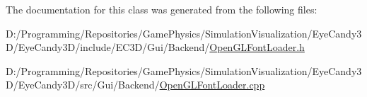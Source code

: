 The documentation for this class was generated from the following files\+:\begin{DoxyCompactItemize}
\item 
D\+:/\+Programming/\+Repositories/\+Game\+Physics/\+Simulation\+Visualization/\+Eye\+Candy3\+D/\+Eye\+Candy3\+D/include/\+E\+C3\+D/\+Gui/\+Backend/\mbox{\hyperlink{_open_g_l_font_loader_8h}{Open\+G\+L\+Font\+Loader.\+h}}\item 
D\+:/\+Programming/\+Repositories/\+Game\+Physics/\+Simulation\+Visualization/\+Eye\+Candy3\+D/\+Eye\+Candy3\+D/src/\+Gui/\+Backend/\mbox{\hyperlink{_open_g_l_font_loader_8cpp}{Open\+G\+L\+Font\+Loader.\+cpp}}\end{DoxyCompactItemize}
